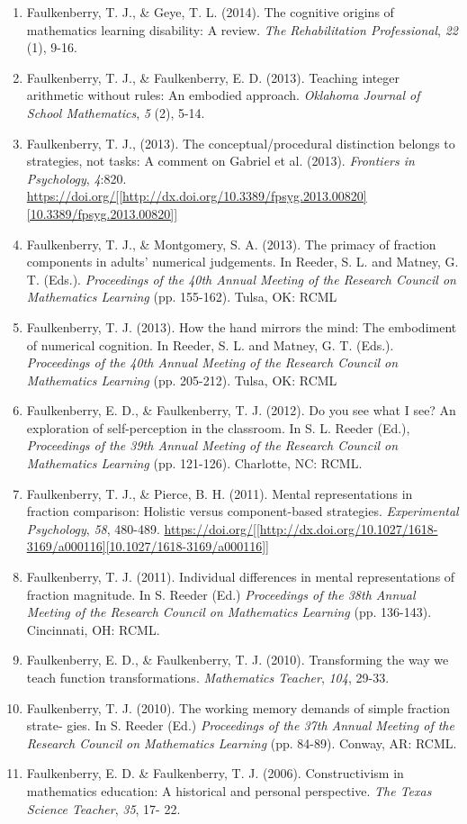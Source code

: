 \documentclass[article,10pt]{article}
\begin{document}
\begin{enumerate}
\item Faulkenberry, T. J., \& Geye, T. L. (2014). The cognitive origins of mathematics learning disability: A review. \emph{The Rehabilitation Professional}, \emph{22} (1), 9-16.
\item Faulkenberry, T. J., \& Faulkenberry, E. D. (2013). Teaching integer arithmetic without rules: An embodied approach. \emph{Oklahoma Journal of School Mathematics}, \emph{5} (2), 5-14.
\item Faulkenberry, T. J., (2013). The conceptual/procedural distinction belongs to strategies, not tasks: A comment on Gabriel et al. (2013). \emph{Frontiers in Psychology}, \emph{4}:820. \url{https://doi.org/[[http://dx.doi.org/10.3389/fpsyg.2013.00820][10.3389/fpsyg.2013.00820]]}
\item Faulkenberry, T. J., \& Montgomery, S. A. (2013). The primacy of fraction components in adults’ numerical judgements. In Reeder, S. L. and Matney, G. T. (Eds.). \emph{Proceedings of the 40th Annual Meeting of the Research Council on Mathematics Learning} (pp. 155-162). Tulsa, OK: RCML
\item Faulkenberry, T. J. (2013). How the hand mirrors the mind: The embodiment of numerical cognition. In Reeder, S. L. and Matney, G. T. (Eds.). \emph{Proceedings of the 40th Annual Meeting of the Research Council on Mathematics Learning} (pp. 205-212). Tulsa, OK: RCML
\item Faulkenberry, E. D., \& Faulkenberry, T. J. (2012). Do you see what I see? An exploration of self-perception in the classroom. In S. L. Reeder (Ed.), \emph{Proceedings of the 39th Annual Meeting of the Research Council on Mathematics Learning} (pp. 121-126). Charlotte, NC: RCML.
\item Faulkenberry, T. J., \& Pierce, B. H. (2011). Mental representations in fraction comparison: Holistic versus component-based strategies. \emph{Experimental Psychology}, \emph{58}, 480-489. \url{https://doi.org/[[http://dx.doi.org/10.1027/1618-3169/a000116][10.1027/1618-3169/a000116]]}
\item Faulkenberry, T. J. (2011). Individual differences in mental representations of fraction magnitude. In S. Reeder (Ed.) \emph{Proceedings of the 38th Annual Meeting of the Research Council on Mathematics Learning} (pp. 136-143). Cincinnati, OH: RCML.
\item Faulkenberry, E. D., \& Faulkenberry, T. J. (2010). Transforming the way we teach function transformations. \emph{Mathematics Teacher}, \emph{104}, 29-33.
\item Faulkenberry, T. J. (2010). The working memory demands of simple fraction strate- gies. In S. Reeder (Ed.) \emph{Proceedings of the 37th Annual Meeting of the Research Council on Mathematics Learning} (pp. 84-89). Conway, AR: RCML.
\item Faulkenberry, E. D. \& Faulkenberry, T. J. (2006). Constructivism in mathematics education: A historical and personal perspective. \emph{The Texas Science Teacher}, \emph{35}, 17- 22.
\end{enumerate}
\end{document}
